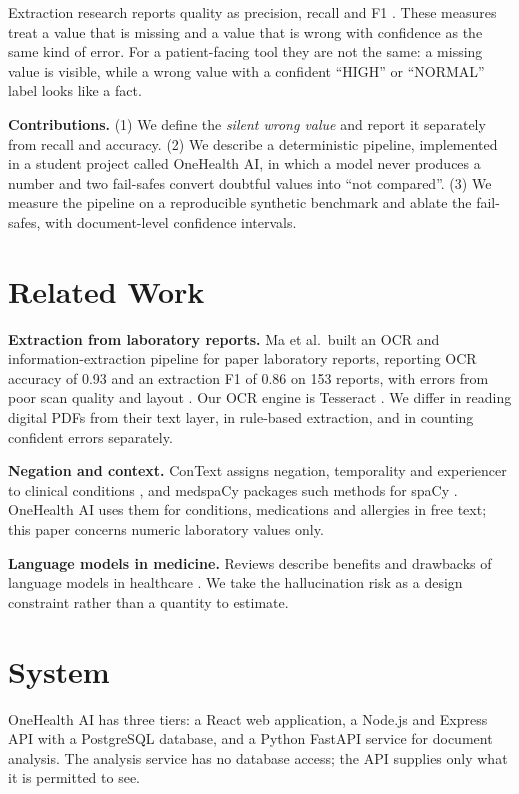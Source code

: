\documentclass[10pt,twocolumn]{article}
\begin{document}
Extraction research reports quality as precision, recall and F1 \cite{ma}. These measures treat a value that is missing and a value that is wrong with confidence as the same kind of error. For a patient-facing tool they are not the same: a missing value is visible, while a wrong value with a confident ``HIGH'' or ``NORMAL'' label looks like a fact.

\textbf{Contributions.} (1) We define the \emph{silent wrong value} and report it separately from recall and accuracy. (2) We describe a deterministic pipeline, implemented in a student project called OneHealth AI, in which a model never produces a number and two fail-safes convert doubtful values into ``not compared''. (3) We measure the pipeline on a reproducible synthetic benchmark and ablate the fail-safes, with document-level confidence intervals.

\section{Related Work}
\textbf{Extraction from laboratory reports.} Ma et al.\ built an OCR and information-extraction pipeline for paper laboratory reports, reporting OCR accuracy of 0.93 and an extraction F1 of 0.86 on 153 reports, with errors from poor scan quality and layout \cite{ma}. Our OCR engine is Tesseract \cite{smith}. We differ in reading digital PDFs from their text layer, in rule-based extraction, and in counting confident errors separately.

\textbf{Negation and context.} ConText assigns negation, temporality and experiencer to clinical conditions \cite{chapman}, and medspaCy packages such methods for spaCy \cite{eyre}. OneHealth AI uses them for conditions, medications and allergies in free text; this paper concerns numeric laboratory values only.

\textbf{Language models in medicine.} Reviews describe benefits and drawbacks of language models in healthcare \cite{thiru}. We take the hallucination risk \cite{llmhalluc} as a design constraint rather than a quantity to estimate.

\section{System}
OneHealth AI has three tiers: a React web application, a Node.js and Express API with a PostgreSQL database, and a Python FastAPI service for document analysis. The analysis service has no database access; the API supplies only what it is permitted to see.
\end{document}
